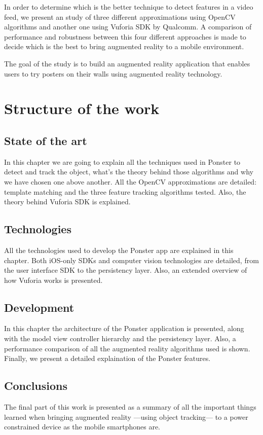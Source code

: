 In order to determine which is the better technique to detect features in a
video feed, we present
an study of three different approximations using OpenCV algorithms and another one
using Vuforia SDK by Qualcomm\textregistered. A comparison of performance and
robustness between this four different approaches is made to decide which is the
best to bring augmented reality to a mobile environment. 

The goal of the study is to build an augmented reality application that enables 
users to try posters on their walls using augmented reality technology.

\section*{Structure of the work}
\subsection*{State of the art}
In this chapter we are going to explain all the techniques used in Ponster to
detect and track the object, what's the theory behind those algorithms and why
we have chosen one above another. All the OpenCV approximations are detailed:
template matching and the three feature tracking algorithms tested. Also, the
theory behind Vuforia SDK is explained.

\subsection*{Technologies}
All the technologies used to develop the Ponster app are explained in this
chapter. Both iOS-only SDKs and computer vision technologies are detailed,
from the user interface SDK to the persistency layer. Also, an extended
overview of how Vuforia works is presented.

\subsection*{Development}
In this chapter the architecture of the Ponster application is presented, along
with the model view controller hierarchy and the persistency layer. Also, a
performance comparison of all the augmented reality algorithms used is
shown. Finally, we present a detailed explaination of the Ponster features.

\subsection*{Conclusions}
The final part of this work is presented as a summary of all the important
things learned when bringing augmented reality ---using object tracking--- to a
power constrained device as the mobile smartphones are.
